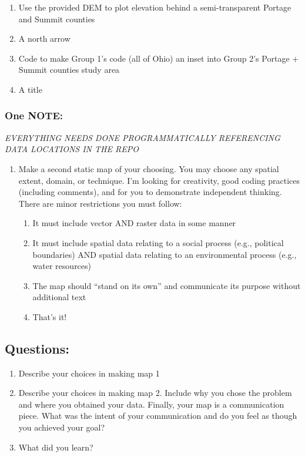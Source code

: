 \documentclass[]{article}
\providecommand{\tightlist}{%
  \setlength{\itemsep}{0pt}\setlength{\parskip}{0pt}}
\begin{document}
\begin{enumerate}
\def\labelenumi{\arabic{enumi}.}
\tightlist
\item
  Use the provided DEM to plot elevation behind a semi-transparent
  Portage and Summit counties
\item
  A north arrow
\item
  Code to make Group 1's code (all of Ohio) an inset into Group 2's
  Portage + Summit counties study area
\item
  A title
\end{enumerate}

\subsubsection{One NOTE:}\label{one-note}

\emph{EVERYTHING NEEDS DONE PROGRAMMATICALLY REFERENCING DATA LOCATIONS
IN THE REPO}

\begin{enumerate}
\def\labelenumi{\arabic{enumi}.}
\setcounter{enumi}{1}
\tightlist
\item
  Make a second static map of your choosing. You may choose any spatial
  extent, domain, or technique. I'm looking for creativity, good coding
  practices (including comments), and for you to demonstrate independent
  thinking. There are minor restrictions you must follow:

  \begin{enumerate}
  \def\labelenumii{\arabic{enumii}.}
  \tightlist
  \item
    It must include vector AND raster data in some manner
  \item
    It must include spatial data relating to a social process (e.g.,
    political boundaries) AND spatial data relating to an environmental
    process (e.g., water resources)
  \item
    The map should ``stand on its own'' and communicate its purpose
    without additional text
  \item
    That's it!
  \end{enumerate}
\end{enumerate}

\subsection{Questions:}\label{questions}

\begin{enumerate}
\def\labelenumi{\arabic{enumi}.}
\item
  Describe your choices in making map 1
\item
  Describe your choices in making map 2. Include why you chose the
  problem and where you obtained your data. Finally, your map is a
  communication piece. What was the intent of your communication and do
  you feel as though you achieved your goal?
\item
  What did you learn?
\end{enumerate}
\end{document}
